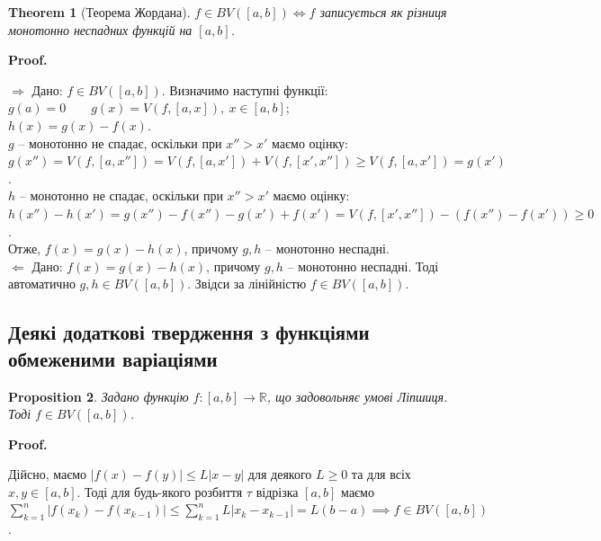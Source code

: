 \documentclass[a4paper, 10pt]{article}
\makeatletter
\def\rightproof{$\boxed{\Rightarrow}$ }
\def\leftproof{$\boxed{\Leftarrow}$ }
\theoremstyle{theoremdd}
\newtheorem{theorem}{Theorem}[subsection]
\theoremstyle{theoremdd}
\theoremstyle{theoremdd}
\theoremstyle{theoremdd}
\theoremstyle{theoremdd}
\newtheorem{example}[theorem]{Example}
\theoremstyle{theoremdd}
\newtheorem{proposition}[theorem]{Proposition}
\theoremstyle{theoremdd}
\theoremstyle{theoremdd}
\theoremstyle{theoremdd}
\renewenvironment{proof}[1][Proof.\\]{\par
\pushQED{\hfill \qed}%
\normalfont \topsep6\p@\@plus6\p@\relax
\trivlist
\item\relax
{\bfseries
#1\@addpunct{.}}\hspace\labelsep\ignorespaces
}{%
\popQED\endtrivlist\@endpefalse
}
\makeatother
\begin{document}

\begin{theorem}[Теорема Жордана]
$f \in BV([a,b]) \iff f$ записується як різниця монотонно неспадних функцій на $[a,b]$.
\end{theorem}

\begin{proof}
\rightproof Дано: $f \in BV([a,b])$. Визначимо наступні функції:\\
$g(a) = 0 \qquad g(x) =V(f,[a,x]),\ x \in [a,b]$;\\
$h(x) = g(x) - f(x)$.\\
$g$ -- монотонно не спадає, оскільки при $x'' > x'$ маємо оцінку: \\
$g(x'') = V(f,[a,x'']) = V(f,[a,x']) + V(f,[x',x'']) \geq V(f,[a,x']) = g(x')$.\\
$h$ -- монотонно не спадає, оскільки при $x'' > x'$ маємо оцінку:\\
$h(x'') - h(x') = g(x'') - f(x'') - g(x') + f(x') = V(f,[x',x'']) - (f(x'') - f(x')) \geq 0$.\\
Отже, $f(x) =  g(x) - h(x)$, причому $g,h$ -- монотонно неспадні.
\bigskip \\
\leftproof Дано: $f(x) = g(x) - h(x)$, причому $g,h$ -- монотонно неспадні. Тоді автоматично $g,h \in BV([a,b])$. Звідси за лінійністю $f \in BV([a,b])$.
\end{proof}

\subsection{Деякі додаткові твердження з функціями обмеженими варіаціями}
\begin{proposition}
Задано функцію $f \colon [a,b] \to \mathbb{R}$, що задовольняє умові Ліпшиця. Тоді $f \in BV([a,b])$.
\end{proposition}

\begin{proof}
Дійсно, маємо $|f(x) - f(y)| \leq L|x-y|$ для деякого $L \geq 0$ та для всіх $x,y \in [a,b]$. Тоді для будь-якого розбиття $\tau$ відрізка $[a,b]$ маємо\\
$\displaystyle\sum_{k=1}^n |f(x_k) - f(x_{k-1})| \leq \sum_{k=1}^n L |x_k - x_{k-1}| = L (b-a) \implies f \in BV([a,b])$.
\end{proof}
\end{document}
